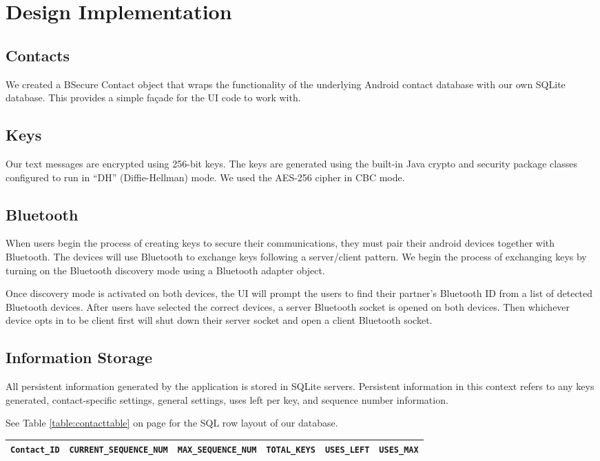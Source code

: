 \section{Design Implementation}
\subsection{Contacts}
We created a BSecure Contact object that wraps the functionality of the underlying Android contact database with 
our own SQLite database. This provides a simple façade for the UI code to work with.
\subsection{Keys}
Our text messages are encrypted using 256-bit keys. The keys are generated using the built-in Java crypto and security package classes configured to run in
``DH'' (Diffie-Hellman) mode. We used the AES-256 cipher in CBC mode.
\subsection{Bluetooth}
When users begin the process of creating keys to secure their communications, they must pair their android devices together with Bluetooth. The devices will use Bluetooth to
exchange keys following a server/client pattern.
We begin the process of exchanging keys by turning on the Bluetooth discovery mode using a Bluetooth adapter object. 

Once discovery mode is activated on both devices, the UI will prompt the users to find their partner's Bluetooth ID from a list of detected Bluetooth devices. 
After users have selected the correct devices, a server Bluetooth socket is opened on both devices. Then whichever device opts in to be client first will shut down
their server socket and open a client Bluetooth socket.

\subsection{Information Storage}
All persistent information generated by the application is stored in SQLite servers. Persistent information in this context refers to any keys generated, contact-specific settings, general settings, uses left per key, and sequence number information.

See Table \ref{table:contacttable} on page \pageref{table:contacttable} for the SQL row layout of our database.

\begin{table*}
\centering
\caption{Contact Table Design}
\label{table:contacttable}
\begin{tabular}{|c|c|c|c|c|c|} \hline
\texttt{Contact\_ID}&\texttt{CURRENT\_SEQUENCE\_NUM}&\texttt{MAX\_SEQUENCE\_NUM}&\texttt{TOTAL\_KEYS}&\texttt{USES\_LEFT}&\texttt{USES\_MAX}\\ \hline\end{tabular}
\end{table*}